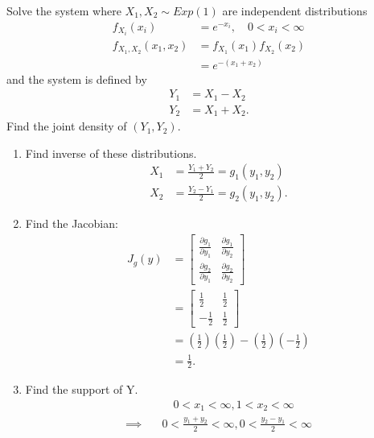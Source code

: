 \begin{example}
	Solve the system where $X_1, X_2 \sim Exp\left( 1 \right)  $ are independent distributions
		\begin{align*}
			f_{X_i}\left( x_{i} \right) &= e^{-x_{i}}, \quad 0 < x_{i} < \infty \\
			f_{X_1, X_2}\left( x_1, x_2 \right) &= f_{X_1}\left( x_1 \right) f_{X_2}\left( x_2 \right)  \\
							    &= e^{-\left( x_1 + x_2 \right) }
		\end{align*}	
	and the system is defined by 
	\begin{align*}
		Y_1 &= X_1 - X_2  \\
		Y_2 &= X_1 + X_2 
	.\end{align*}
	Find the joint density of $\left( Y_1, Y_2 \right) $. 	
	\begin{enumerate}
		\item Find inverse of these distributions. 
			\begin{align*}
X_1 &= \frac{Y_1 + Y_2}{2} = g_1\left( y_1, y_2 \right)  \\
	X_2 &= \frac{Y_2 - Y_1}{2} = g_2\left( y_1, y_2 \right) 
			.\end{align*}
		\item Find the Jacobian:
			\begin{align*}
				J_{g}\left( y \right) &= \begin{bmatrix} 
				\frac{\partial g_1}{\partial y_1} & \frac{\partial g_1}{\partial y_2} \\
			\frac{\partial g_2}{\partial y_1} & \frac{\partial g_2}{\partial y_2} \end{bmatrix}  \\
							  &= \begin{bmatrix} \frac{1}{2} & \frac{1}{2} \\
							  -\frac{1}{2} & \frac{1}{2}\end{bmatrix}  \\
								       &= \left( \frac{1}{2} \right) \left( \frac{1}{2} \right)  - \left( \frac{1}{2} \right) \left( -\frac{1}{2} \right)  \\
								       &= \frac{1}{2}
			.\end{align*}
		\item Find the support of Y. 
			\begin{align*}
				& \quad0 < x_1 < \infty , 1 < x_2 < \infty \\
				\implies \quad & 0 < \frac{y_1 + y_2}{2} < \infty , 0 <  \frac{y_2 - y_1}{2} < \infty \\

\end{align*}
\end{enumerate}
\end{example}
